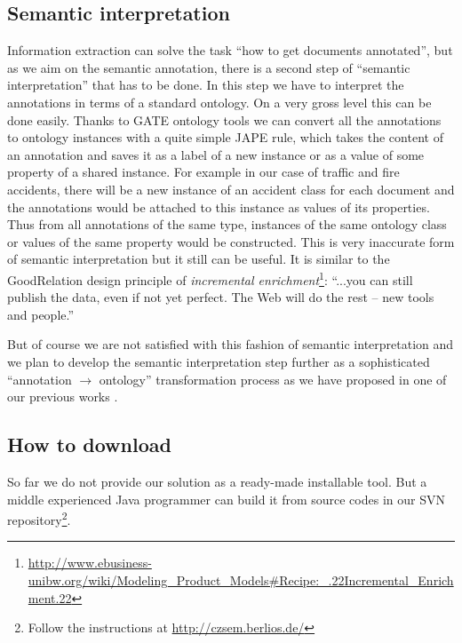 \documentclass[runningheads,a4paper]{llncs}
\begin{document}
\subsection{Semantic interpretation}
\label{sec:SemanticInterpretation}
Information extraction can solve the task ``how to get documents annotated'', but as we aim on the semantic annotation, there is a second step of ``semantic interpretation'' that has to be done. In this step we have to interpret the annotations in terms of a standard ontology. On a very gross level this can be done easily. Thanks to GATE ontology tools \cite{Bon04b} we can convert all the annotations to ontology instances with a quite simple JAPE \cite{Cunningham00jape:a} rule, which takes the content of an annotation and saves it as a label of a new instance or as a value of some property of a shared instance. For example in our case of traffic and fire accidents, there will be a new instance of an accident class for each document and the annotations would be attached to this instance as values of its properties. Thus from all annotations of the same type, instances of the same ontology class or values of the same property would be constructed. This is very inaccurate form of semantic interpretation but it still can be useful. It is similar to the GoodRelation \cite{DBLP:conf/ekaw/Hepp08} design principle of \emph{incremental enrichment}\footnote{\url{http://www.ebusiness-unibw.org/wiki/Modeling_Product_Models#Recipe:_.22Incremental_Enrichment.22}}:
``...you can still publish the data, even if not yet perfect. The Web will do the rest -- new tools and people.''	

But of course we are not satisfied with this fashion of semantic interpretation and we plan to develop the semantic interpretation step further as a sophisticated ``annotation $\rightarrow$ ontology'' transformation process as we have proposed in one of our previous works \cite{biblio:DeVoComputingaggregations2008}.

\subsection{How to download}
So far we do not provide our solution as a ready-made installable tool. But a middle experienced Java programmer can build it from source codes in our SVN repository\footnote{Follow the instructions at \url{http://czsem.berlios.de/}}.
\end{document}
